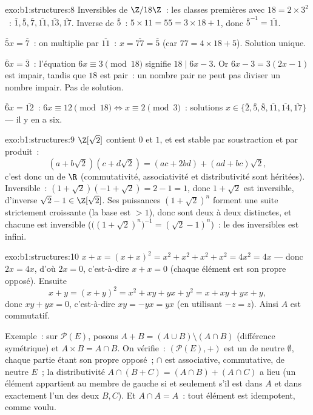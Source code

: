 \begin{solution}{exo:b1:structures:8}
Inversibles de $\Z/18\Z$~: les classes premières avec $18 = 2 \times
3^2$~: $\overline 1, \overline 5, \overline 7, \overline{11},
\overline{13}, \overline{17}$. Inverse de $\overline 5$~: $5 \times 11
= 55 = 3\times 18 + 1$, donc $\overline 5^{-1} = \overline{11}$.

$\overline 5 x = \overline 7$~: on multiplie par $\overline{11}$~: $x =
\overline{77} = \overline 5$ (car $77 = 4\times 18 + 5$). Solution
unique.

$\overline 6 x = \overline 3$~: l'équation $6x \equiv 3 \pmod{18}$
signifie $18 \mid 6x - 3$. Or $6x - 3 = 3(2x - 1)$ est impair, tandis
que $18$ est pair~: un nombre pair ne peut pas diviser un nombre impair.
Pas de solution.

$\overline 6 x = \overline{12}$~: $6x \equiv 12 \pmod{18} \iff x
\equiv 2 \pmod 3$~: solutions $x \in \{\overline 2, \overline 5,
\overline 8, \overline{11}, \overline{14}, \overline{17}\}$ --- il y en
a six.
\end{solution}

\begin{solution}{exo:b1:structures:9}
$\Z[\sqrt 2]$ contient $0$ et $1$, et est stable par soustraction et par
produit~:
\[
(a + b\sqrt 2)(c + d\sqrt 2) = (ac + 2bd) + (ad + bc)\sqrt 2 ,
\]
c'est donc un  de $\R$ (commutativité, associativité et
distributivité sont héritées). Inversible~: $(1 + \sqrt 2)(-1 + \sqrt 2)
= 2 - 1 = 1$, donc $1 + \sqrt 2$ est inversible, d'inverse $\sqrt 2 - 1
\in \Z[\sqrt 2]$. Ses puissances $(1 + \sqrt 2)^n$ forment une suite
strictement croissante (la base est $> 1$), donc sont deux à deux
distinctes, et chacune est inversible ($\bigl((1+\sqrt2)^n\bigr)^{-1} =
(\sqrt 2 - 1)^n$)~: le  des inversibles est infini.
\end{solution}

\begin{solution}{exo:b1:structures:10}
$x + x = (x + x)^2 = x^2 + x^2 + x^2 + x^2 = 4x^2 = 4x$ --- donc $2x =
4x$, d'où $2x = 0$, c'est-à-dire $x + x = 0$ (chaque élément est son
propre opposé). Ensuite
\[
x + y = (x+y)^2 = x^2 + xy + yx + y^2 = x + xy + yx + y ,
\]
donc $xy + yx = 0$, c'est-à-dire $xy = -yx = yx$ (en utilisant
$-z = z$). Ainsi $A$ est commutatif.

Exemple~: sur $\mathcal{P}(E)$, posons $A + B = (A \cup B) \setminus (A
\cap B)$ (différence symétrique) et $A \times B = A \cap B$. On
vérifie~: $(\mathcal{P}(E), +)$ est un  de neutre
$\emptyset$, chaque partie étant son propre opposé~; $\cap$ est
associative, commutative, de neutre $E$~; la distributivité $A \cap (B +
C) = (A \cap B) + (A \cap C)$ a lieu (un élément appartient au membre de
gauche si et seulement s'il est dans $A$ et dans exactement l'un des
deux  $B, C$). Et $A \cap A = A$~: tout élément est idempotent,
comme voulu.
\end{solution}

